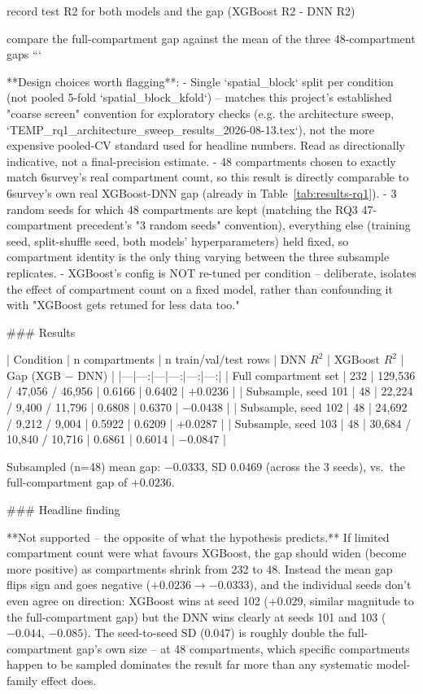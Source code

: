     record test R2 for both models and the gap (XGBoost R2 - DNN R2)

compare the full-compartment gap against the mean of the three 48-compartment gaps
```

**Design choices worth flagging**:
- Single `spatial_block` split per condition (not pooled 5-fold `spatial_block_kfold`) -- matches
  this project's established "coarse screen" convention for exploratory checks (e.g. the
  architecture sweep, `TEMP_rq1_architecture_sweep_results_2026-08-13.tex`), not the more
  expensive pooled-CV standard used for headline numbers. Read as directionally indicative, not a
  final-precision estimate.
- 48 compartments chosen to exactly match 6survey's real compartment count, so this result is
  directly comparable to 6survey's own real XGBoost-DNN gap (already in Table~\ref{tab:results-rq1}).
- 3 random seeds for which 48 compartments are kept (matching the RQ3 47-compartment precedent's
  "3 random seeds" convention), everything else (training seed, split-shuffle seed, both models'
  hyperparameters) held fixed, so compartment identity is the only thing varying between the three
  subsample replicates.
- XGBoost's config is NOT re-tuned per condition -- deliberate, isolates the effect of compartment
  count on a fixed model, rather than confounding it with "XGBoost gets retuned for less data too."

### Results

| Condition | n compartments | n train/val/test rows | DNN $R^2$ | XGBoost $R^2$ | Gap (XGB $-$ DNN) |
|---|---:|---|---:|---:|---:|
| Full compartment set | 232 | 129,536 / 47,056 / 46,956 | 0.6166 | 0.6402 | $+0.0236$ |
| Subsample, seed 101 | 48 | 22,224 / 9,400 / 11,796 | 0.6808 | 0.6370 | $-0.0438$ |
| Subsample, seed 102 | 48 | 24,692 / 9,212 / 9,004 | 0.5922 | 0.6209 | $+0.0287$ |
| Subsample, seed 103 | 48 | 30,684 / 10,840 / 10,716 | 0.6861 | 0.6014 | $-0.0847$ |

Subsampled (n=48) mean gap: $-0.0333$, SD $0.0469$ (across the 3 seeds), vs.\ the full-compartment
gap of $+0.0236$.

### Headline finding

**Not supported -- the opposite of what the hypothesis predicts.** If limited compartment count
were what favours XGBoost, the gap should widen (become more positive) as compartments shrink from
232 to 48. Instead the mean gap flips sign and goes negative ($+0.0236 \to -0.0333$), and the
individual seeds don't even agree on direction: XGBoost wins at seed 102 (+0.029, similar
magnitude to the full-compartment gap) but the DNN wins clearly at seeds 101 and 103 ($-0.044$,
$-0.085$). The seed-to-seed SD (0.047) is roughly double the full-compartment gap's own size --
at 48 compartments, which specific compartments happen to be sampled dominates the result far more
than any systematic model-family effect does.

